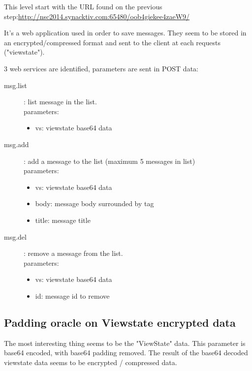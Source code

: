 \documentclass[a4paper]{article}
\begin{document}
This level start with the URL found on the previous step:\newline \href{http://nsc2014.synacktiv.com:65480/oob4giekee4zaeW9/}{http://nsc2014.synacktiv.com:65480/oob4giekee4zaeW9/}

It's a web application used in order to save messages. They seem to be stored in an encrypted/compressed format and sent to the client at each requests ("viewstate").
\newline

3 web services are identified, parameters are sent in POST data:
\begin{description}
    \item[msg.list]: list message in the list. \hfill \\
    parameters:
    \begin{itemize}
        \item vs: viewstate base64 data
    \end{itemize}
    \item[msg.add]: add a message to the list (maximum 5 messages in list)\hfill \\
    parameters:
    \begin{itemize}
        \item vs: viewstate base64 data
        \item body: message body surrounded by  tag
        \item title: message title
    \end{itemize}
    \item[msg.del]: remove a message from the list.\hfill \\
    parameters:
    \begin{itemize}
        \item vs: viewstate base64 data
        \item id: message id to remove
    \end{itemize}
\end{description}

\subsection{Padding oracle on Viewstate encrypted data}

The most interesting thing seems to be the "ViewState" data. This parameter is base64 encoded, with base64 padding removed.
The result of the base64 decoded viewstate data seems to be encrypted / compressed data.
\end{document}
